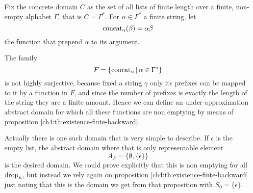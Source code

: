 \begin{example}
	Fix the concrete domain $C$ as the set of all lists of finite length over a finite, non-empty alphabet $\Gamma$, that is $C = \Gamma^{*}$.
	For $\alpha \in \Gamma^*$ a finite string, let
	\[
	\text{concat}_{\alpha}(\beta) = \alpha \beta
	\]
	the function that prepend $\alpha$ to its argument.

	The family
	\[
	F = \{ \text{concat}_{\alpha} \,\vert\, \alpha \in \Gamma^* \}
	\]
	is not highly surjective, because fixed a string $\gamma$ only its prefixes can be mapped to it by a function in $F$, and since the number of prefixes is exactly the length of the string they are a finite amount.
	Hence we can define an under-approximation abstract domain for which all these functions are non emptying by means of proposition \ref{ch4:th:existence-finte-backward}.

	Actually there is one such domain that is very simple to describe. If $\epsilon$ is the empty list, the abstract domain where that is only representable element
	\[
	A_F = \{ \emptyset, \{ \epsilon \} \}
	\]
	is the desired domain. We could prove explicitly that this is non emptying for all $\text{drop}_n$, but instead we rely again on proposition \ref{ch4:th:existence-finte-backward} just noting that this is the domain we get from that proposition with $S_0 = \{ \epsilon \}$.
\end{example}

